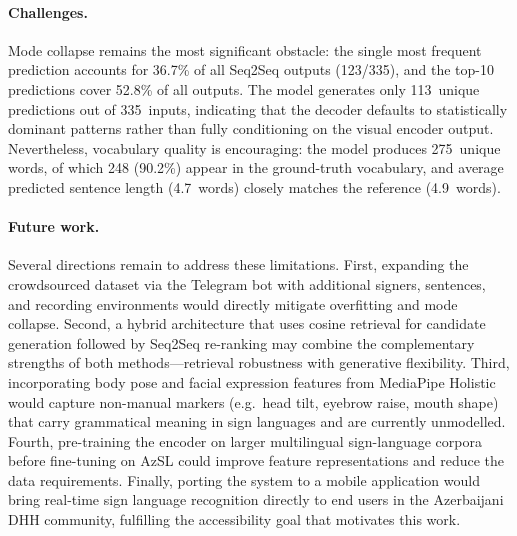 \documentclass[runningheads]{llncs}
\begin{document}
\paragraph{Challenges.}
Mode collapse remains the most significant obstacle: the single most
frequent prediction accounts for 36.7\% of all Seq2Seq outputs
(123/335), and the top-10 predictions cover 52.8\% of all outputs.
The model generates only 113~unique predictions out of 335~inputs,
indicating that the decoder defaults to statistically dominant
patterns rather than fully conditioning on the visual encoder
output.
Nevertheless, vocabulary quality is encouraging: the model produces
275~unique words, of which 248 (90.2\%) appear in the ground-truth
vocabulary, and average predicted sentence length (4.7~words)
closely matches the reference (4.9~words).

\paragraph{Future work.}
Several directions remain to address these limitations.
First, expanding the crowdsourced dataset via the Telegram bot with
additional signers, sentences, and recording environments would
directly mitigate overfitting and mode collapse.
Second, a hybrid architecture that uses cosine retrieval for
candidate generation followed by Seq2Seq re-ranking may combine the
complementary strengths of both methods—retrieval robustness with
generative flexibility.
Third, incorporating body pose and facial expression features from
MediaPipe Holistic would capture non-manual markers (e.g.\ head
tilt, eyebrow raise, mouth shape) that carry grammatical meaning in
sign languages and are currently unmodelled.
Fourth, pre-training the encoder on larger multilingual
sign-language corpora before fine-tuning on AzSL could improve
feature representations and reduce the data requirements.
Finally, porting the system to a mobile application would bring
real-time sign language recognition directly to end users in the
Azerbaijani DHH community, fulfilling the accessibility goal that
motivates this work.
\end{document}
